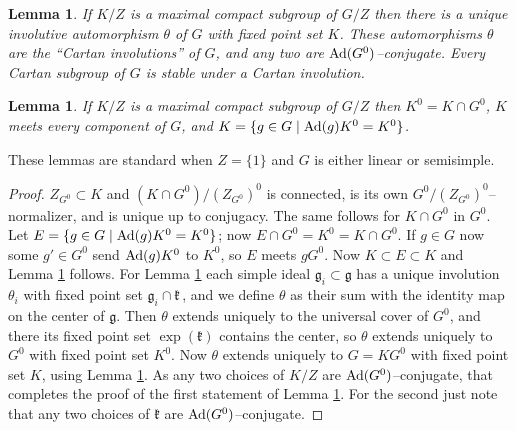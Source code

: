 \documentclass{conm-p-l}
\newtheorem{lemma}[equation]{Lemma}
\renewcommand{\gg}{\mathfrak{g}}
\def\gg{\mathfrak{g}}
\def\gk{\mathfrak{k}}
\def\Ad{{\rm Ad}}
\begin{document}
\begin{lemma}\label{4.1.1} If $K/Z$ is a maximal compact subgroup of $G/Z$
then there is a unique involutive automorphism $\theta$ of $G$ with
fixed point set $K$.
These automorphisms $\theta$ are the ``Cartan involutions'' of $G$, and
any two are $\Ad(G^0)$--conjugate. Every
Cartan subgroup of $G$ is stable under a Cartan involution.
\end{lemma}
\begin{lemma}\label{4.1.2} If $K/Z$ is a maximal compact subgroup of $G/Z$
then $K^0 = K\cap G^0$, $K$ meets every component of $G$, and
$K = \{g \in G \mid \Ad(g)K^0 = K^0\}$.
\end{lemma}
These lemmas are standard when $Z = \{1\}$ and $G$ is either 
linear or semisimple.
\begin{proof} $Z_{G^0} \subset K$ and $(K\cap G^0)/(Z_{G^0})^0$ is connected,
is its own $G^0/(Z_{G^0})^0$--normalizer, and is unique up to conjugacy.
The same follows for $K\cap G^0$ in $G^0$.  Let
$E = \{g \in G \mid \Ad(g)K^0 = K^0\}$; now $E \cap G^0 = K^0 = K \cap G^0$.
If $g \in G$ now some $g' \in G^0$ send $\Ad(g)K^0$ to $K^0$, so $E$ meets
$gG^0$.  Now $K \subset E \subset K$ and Lemma \ref{4.1.2} follows.  For
Lemma \ref{4.1.1} each simple ideal $\gg_i \subset \gg$ has a unique
involution $\theta_i$ with fixed point set $\gg_i\cap\gk$\,, and we define
$\theta$ as their sum with the identity map on the center of $\gg$.  Then
$\theta$ extends uniquely to the universal cover of $G^0$, and there its
fixed point set $\exp(\gk)$ contains the center, so $\theta$ extends
uniquely to $G^0$ with fixed point set $K^0$.  Now $\theta$ extends 
uniquely to $G = KG^0$ with fixed point set $K$, using Lemma \ref{4.1.2}.
As any two choices of $K/Z$ are $\Ad(G^0)$--conjugate, that completes the
proof of the first statement of Lemma \ref{4.1.1}.  For the second just note
that any two choices of $\gk$ are $\Ad(G^0)$--conjugate.
\end{proof}
\end{document}
